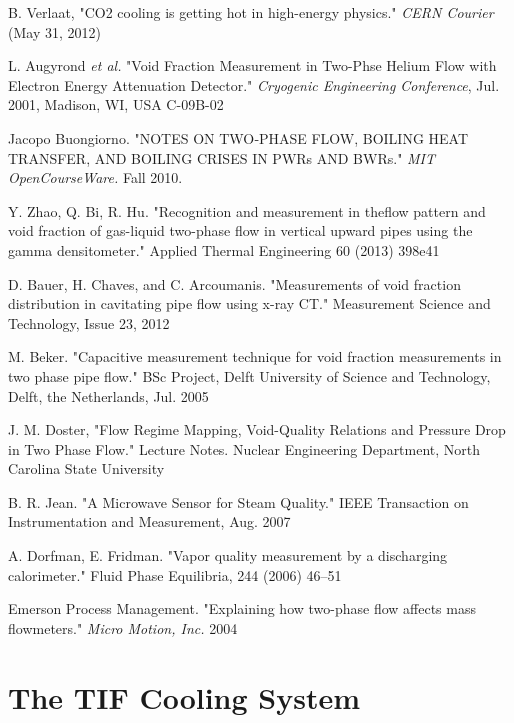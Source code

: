 \documentclass{report}
\begin{document}
\begin{thebibliography}{9}
B. Verlaat, "CO2 cooling is getting hot in high-energy physics." \textit{CERN Courier} (May 31, 2012)

L. Augyrond \textit{et al.} "Void Fraction Measurement in Two-Phse Helium Flow with Electron Energy Attenuation Detector." \textit{Cryogenic Engineering Conference}, Jul. 2001, Madison, WI, USA C-09B-02

Jacopo Buongiorno. "NOTES ON TWO‐PHASE FLOW, BOILING HEAT TRANSFER, AND BOILING CRISES
IN PWRs AND BWRs." \textit{MIT OpenCourseWare.} Fall 2010.

Y. Zhao, Q. Bi, R. Hu. "Recognition and measurement in theflow pattern and void fraction of gas-liquid two-phase flow in vertical upward pipes using the gamma densitometer." Applied Thermal Engineering 60 (2013) 398e41

D. Bauer, H. Chaves, and C. Arcoumanis. "Measurements of void fraction distribution in cavitating pipe flow
using x-ray CT." Measurement Science and Technology, Issue 23, 2012

M. Beker. "Capacitive measurement technique for void fraction measurements in two phase pipe flow." BSc Project, Delft University of Science and Technology, Delft, the Netherlands, Jul. 2005

J. M. Doster, "Flow Regime Mapping, Void-Quality Relations and Pressure Drop in Two Phase Flow." Lecture Notes. Nuclear Engineering Department, North Carolina State University 

B. R. Jean. "A Microwave Sensor for Steam Quality." IEEE Transaction on Instrumentation and Measurement, Aug. 2007

A. Dorfman, E. Fridman. "Vapor quality measurement by a discharging calorimeter." Fluid Phase Equilibria, 244 (2006) 46–51

Emerson Process Management. "Explaining how two-phase flow affects mass flowmeters." \textit{Micro Motion, Inc.} 2004

\end{thebibliography}
\appendix
\chapter{The TIF Cooling System}\label{app:TIF}


%
%
\end{document}
